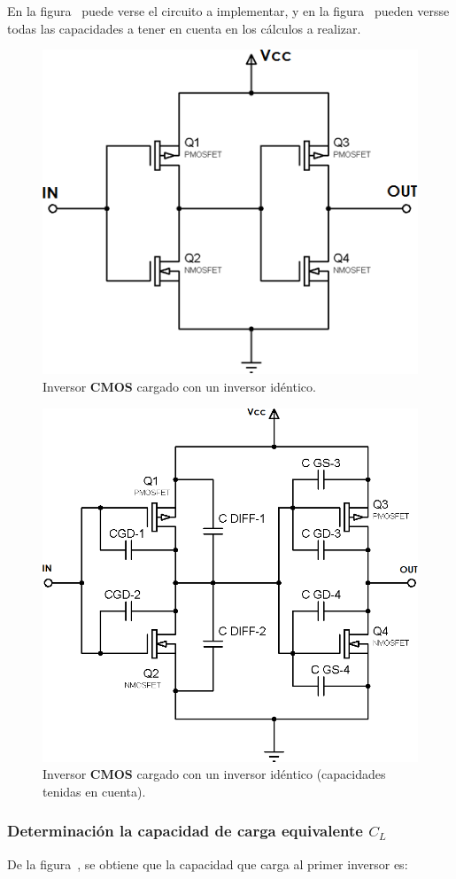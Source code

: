 En la figura~ puede verse el circuito a implementar, y en la figura~ pueden versse todas las capacidades a tener en cuenta en los cálculos a realizar.


\begin{figure}[H] %
\begin{center}
\includegraphics[width=0.3 \textwidth, angle=0]{./img/point1/inverter_loaded_with_inverter}
\caption{\label{fig:fig_inverter_loaded_with_inverter}\footnotesize{Inversor \textbf{CMOS} cargado con un inversor idéntico.}}
\end{center}
\end{figure}



\begin{figure}[H] %
\begin{center}
\includegraphics[width=0.3 \textwidth, angle=0]{./img/point1/inverter_loaded_with_inverter_capacitances}
\caption{\label{fig:fig_inverter_loaded_with_inverter_capacitances}\footnotesize{Inversor \textbf{CMOS} cargado con un inversor idéntico (capacidades tenidas en cuenta).}}
\end{center}
\end{figure}



\vfill

\clearpage


\subsubsection{Determinación la capacidad de carga equivalente $C_{L}$}


De la figura~, se obtiene que la capacidad que carga al primer inversor es:



